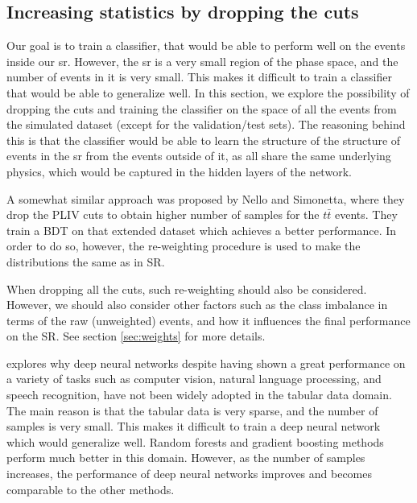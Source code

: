 \subsection{Increasing statistics by dropping the cuts}

Our goal is to train a classifier, that would be able to perform well on the events inside our \gls{sr}. However, the
\gls{sr} is a very small region of the phase space, and the number of events in it is very small. This makes it
difficult to train a classifier that would be able to generalize well. In this section, we explore the possibility of
dropping the cuts and training the classifier on the space of all the events from the simulated dataset (except for the
validation/test sets). The reasoning behind this is that the classifier would be able to learn the structure of the
structure of events in the \gls{sr} from the events outside of it, as all share the same underlying physics, which would
be captured in the hidden layers of the network.

A somewhat similar approach was proposed by Nello and Simonetta, where they drop the PLIV cuts to obtain higher number
of samples for the $t\bar{t}$ events. They train a BDT on that extended dataset which achieves a better performance. In
order to do so, however, the re-weighting procedure is used to make the distributions the same as in SR.

When dropping all the cuts, such re-weighting should also be considered. However, we should also consider other factors
such as the class imbalance in terms of the raw (unweighted) events, and how it influences the final performance on the
SR. See section \ref{sec:weights} for more details.

\cite{tabular} explores why deep neural networks despite having shown a great performance on a variety of tasks such as
computer vision, natural language processing, and speech recognition, have not been widely adopted in the tabular data
domain. The main reason is that the tabular data is very sparse, and the number of samples is very small. This makes it
difficult to train a deep neural network which would generalize well. Random forests and gradient boosting methods
perform much better in this domain. However, as the number of samples increases, the performance of deep neural networks
improves and becomes comparable to the other methods.

